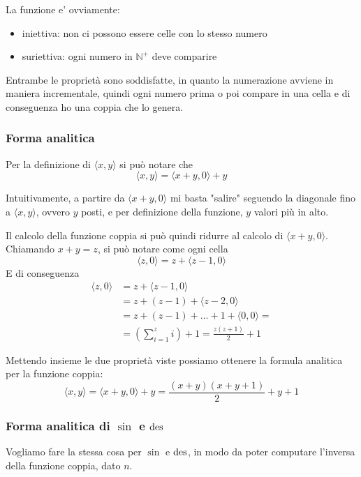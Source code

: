 La funzione e' ovviamente:
\begin{itemize}
	\item iniettiva: non ci possono essere celle con lo stesso numero
	\item suriettiva: ogni numero in $\mathbb{N}^+$ deve comparire
\end{itemize}
Entrambe le proprietà sono soddisfatte, in quanto la numerazione avviene in maniera incrementale, quindi ogni numero prima o poi compare in una cella e di conseguenza ho una coppia che lo genera.

\subsubsection{Forma analitica} 
Per la definizione di $\langle x,y \rangle$ si può notare che
$$ \langle x,y \rangle = \langle x + y,0 \rangle + y $$

\begin{center}
	
\end{center}

Intuitivamente, a partire da $\langle x + y, 0\rangle$ mi basta "salire" seguendo la diagonale fino a $\langle x,y \rangle$, ovvero $y$ posti, e per definizione della funzione, $y$ valori più in alto.

Il calcolo della funzione coppia si può quindi ridurre al calcolo di $\langle x + y, 0 \rangle$. Chiamando $x + y = z$, si può notare come ogni cella
$$ \langle z,0 \rangle = z + \langle z - 1, 0 \rangle $$
E di conseguenza
\begin{align*}
	\langle z,0 \rangle & = z + \langle z - 1, 0 \rangle \\
	& = z + (z-1) + \langle z-2, 0 \rangle \\
	& = z + (z-1) + \dots + 1 + \langle 0,0 \rangle = \\
	& = \left( \sum_{i=1}^{z} i \right) + 1 = \frac{z(z+1)}{2} + 1
\end{align*}

Mettendo insieme le due proprietà viste possiamo ottenere la formula analitica per la funzione coppia: 
$$ \langle x,y \rangle = \langle x + y, 0 \rangle + y = \frac{(x + y) (x + y + 1)}{2} + y + 1 $$

\subsubsection{Forma analitica di $\sin$ e $\operatorname{des}$}

Vogliamo fare la stessa cosa per $\sin$ e $\operatorname{des}$, in modo da poter computare l'inversa della funzione coppia, dato $n$.

